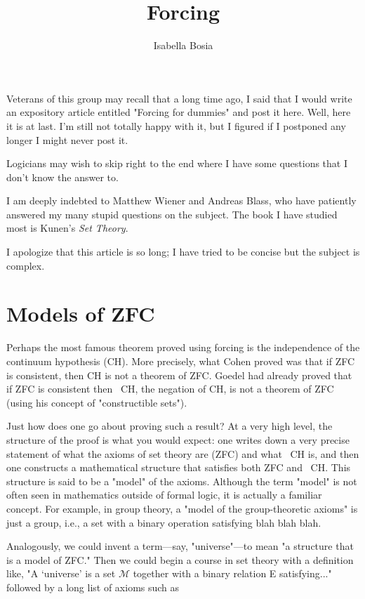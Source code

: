 \documentclass[10pt]{article}
\title{Forcing}
\author{Isabella Bosia}
\date{}
\theoremstyle{definition}
\begin{document}
\maketitle


Veterans of this group may recall that a long time ago, I said that I would
write an expository article entitled "Forcing for dummies" and post it here.
Well, here it is at last.  I'm still not totally happy with it, but I
figured if I postponed any longer I might never post it.

Logicians may wish to skip right to the end where I have some questions that
I don't know the answer to.

I am deeply indebted to Matthew Wiener and Andreas Blass, who have patiently
answered my many stupid questions on the subject.  The book I have studied
most is Kunen's \textit{Set Theory}.

I apologize that this article is so long; I have tried to be concise but the
subject is complex.


\section{Models of ZFC}

Perhaps the most famous theorem proved using forcing is the independence of
the continuum hypothesis (CH).  More precisely, what Cohen proved was that
if ZFC is consistent, then CH is not a theorem of ZFC.  Goedel had already
proved that if ZFC is consistent then ~CH, the negation of CH, is not a
theorem of ZFC (using his concept of "constructible sets").

Just how does one go about proving such a result?  At a very high level, the
structure of the proof is what you would expect: one writes down a very
precise statement of what the axioms of set theory are (ZFC) and what ~CH
is, and then one constructs a mathematical structure that satisfies both ZFC
and ~CH.  This structure is said to be a "model" of the axioms.  Although
the term "model" is not often seen in mathematics outside of formal logic,
it is actually a familiar concept.  For example, in group theory, a "model
of the group-theoretic axioms" is just a group, i.e., a set with a binary
operation satisfying blah blah blah.

Analogously, we could invent a term---say, "universe"---to mean "a structure
that is a model of ZFC."  Then we could begin a course in set theory with a
definition like, "A `universe' is a set $\mathcal{M}$ together with a binary relation E
satisfying..." followed by a long list of axioms such as
\end{document}
